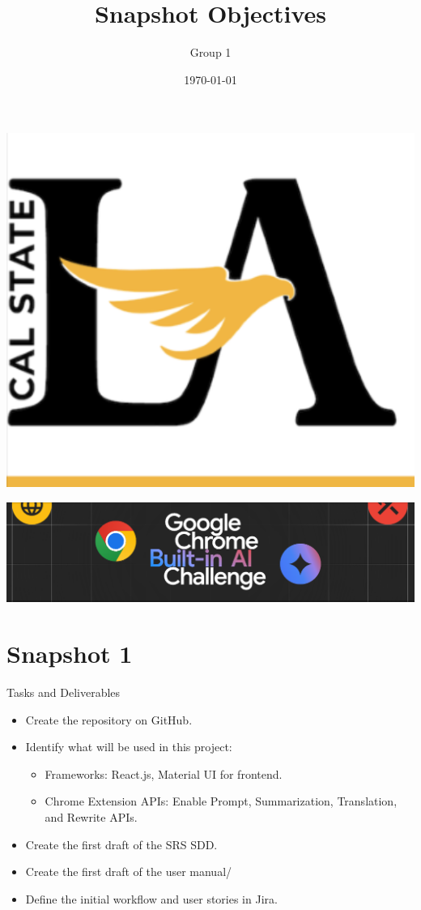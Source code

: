 \documentclass{article}
\title{Snapshot Objectives}
\author{Group 1 }
\date{\today}
\begin{document}
\maketitle  
\pagebreak

\includegraphics[width=0.3\linewidth]{../logo/csula.png} 

\includegraphics[width=0.3\linewidth]{../logo/chromeai.png} 

\section{Snapshot 1}
Tasks and Deliverables
\begin{itemize}
    \item Create the repository on GitHub.
    \item Identify what will be used in this project:
    \begin{itemize}
        \item Frameworks: React.js, Material UI for frontend.
        \item Chrome Extension APIs: Enable Prompt, Summarization, Translation, and Rewrite APIs.
    \end{itemize}
    \item Create the first draft of the SRS SDD.
    \item Create the first draft of the user manual/
    \item Define the initial workflow and user stories in Jira.
\end{itemize}
\end{document}
